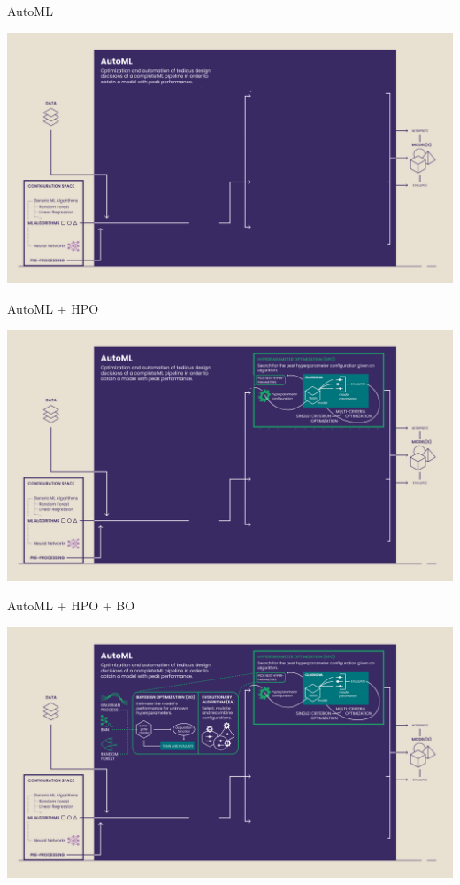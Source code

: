 	\begin{frame}[c]{AutoML}
		
	\centering
	\includegraphics[width=.9\textwidth]{images/18_AutoML-Components-Overview-Infographic_corrected_e1}
		
	\end{frame}
	\begin{frame}[c]{AutoML + HPO}
		
		\centering
		\includegraphics[width=.9\textwidth]{images/18_AutoML-Components-Overview-Infographic_corrected_e2}
		
	\end{frame}
	\begin{frame}[c]{AutoML + HPO + BO}
		
		\centering
		\includegraphics[width=.9\textwidth]{images/18_AutoML-Components-Overview-Infographic_corrected_e3}
		
	\end{frame}
